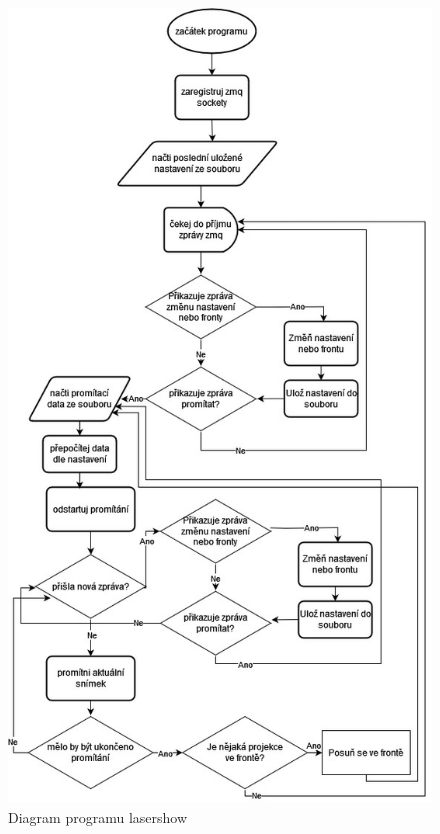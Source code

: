 \begin{figure}[H]
  \centering
  \includegraphics[height=(\textheight{}-2cm), trim=0 0 0 0, clip]{img/lasershow_flowchart.jpg}
  \caption{\label{fig:lasershow-flowchart} Diagram programu lasershow}
\end{figure}


